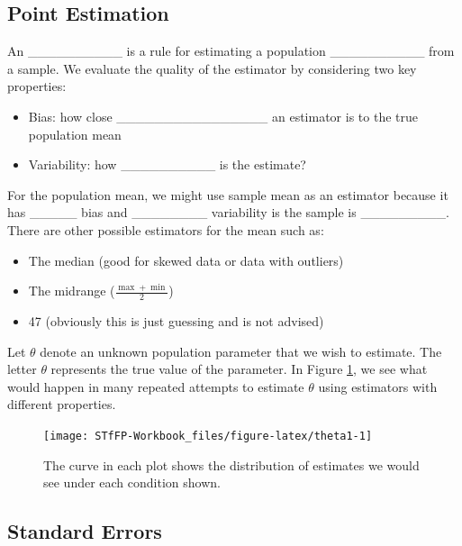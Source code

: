 \documentclass[]{book}
\providecommand{\tightlist}{%
  \setlength{\itemsep}{0pt}\setlength{\parskip}{0pt}}
\theoremstyle{definition}
\theoremstyle{definition}
\theoremstyle{remark}
\begin{document}
\subsection{Point Estimation}\label{point-estimation}

An \_\_\_\_\_\_\_\_\_\_ is a rule for estimating a population
\_\_\_\_\_\_\_\_\_\_ from a sample. We evaluate the quality of the
estimator by considering two key properties:

\begin{itemize}
\tightlist
\item
  Bias: how close \_\_\_\_\_\_\_\_\_\_\_\_\_\_\_\_ an estimator is to
  the true population mean \vspace{.1in}
\item
  Variability: how \_\_\_\_\_\_\_\_\_\_ is the estimate?
\end{itemize}

For the population mean, we might use sample mean as an estimator
because it has \_\_\_\_\_ bias and \_\_\_\_\_\_\_\_ variability is the
sample is \_\_\_\_\_\_\_\_\_. There are other possible estimators for
the mean such as:

\begin{itemize}
\tightlist
\item
  The median (good for skewed data or data with outliers)
\item
  The midrange (\(\frac{\max + \min}{2}\))
\item
  47 (obviously this is just guessing and is not advised)
\end{itemize}

Let \(\theta\) denote an unknown population parameter that we wish to
estimate. The letter \(\theta\) represents the true value of the
parameter. In Figure \ref{fig:theta1}, we see what would happen in many
repeated attempts to estimate \(\theta\) using estimators with different
properties.

\begin{figure}[h]

{\centering \texttt{[image: STfFP-Workbook\_files/figure-latex/theta1-1]} 

}

\caption{The curve in each plot shows the distribution of estimates we would see under each condition shown.}\label{fig:theta1}
\end{figure}

\subsection{Standard Errors}\label{standard-errors}
\end{document}
